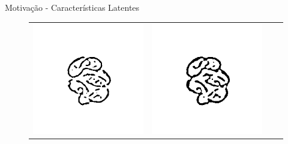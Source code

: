 \documentclass{beamer}
\begin{document}
\begin{frame}{Motivação - Características Latentes}
\begin{figure}[htbp]
\begin{center}
\begin{tabular}{c|c|c|c}
   \includegraphics[width=0.2\linewidth]{figuras/alga_05db.png}&
   \includegraphics[width=0.2\linewidth]{figuras/alga_05eb.png} \\
 \end{tabular}


\end{center}
\end{figure}
\end{frame}
\end{document}
